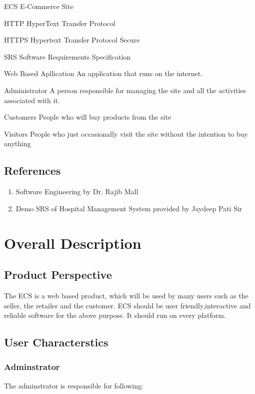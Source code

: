 \documentclass{article}
\begin{document}
\begin{abbrv}
\item[ECS] E-Commerce Site
\item[HTTP]HyperText Transfer Protocol  
\item[HTTPS]Hypertext Transfer Protocol Secure
\item[SRS] Software Requirements Specification
\item[Web Based Apllication] An application that runs on the internet.
\vspace{1cm}
\item[Administrator] A person responsible for managing the site and all the activities associated with it.
\item[Customers] People  who will buy products from the site
\item[Visitors] People who just occasionally visit the site without the intention to buy anything
\end{abbrv}
\subsection{References}
\begin{enumerate}
\item Software Engineering by Dr. Rajib Mall
\item Demo SRS of Hospital Management System provided by Jaydeep Pati Sir
\end{enumerate}
		

\section{Overall Description}
\subsection{Product Perspective}
The ECS is a web based product, which will be used by many users such as the seller, the retailer and the customer. ECS should be user friendly,interactive and reliable software for the above purpose. It should run on every platform.

\subsection{User Characterstics}
\subsubsection{Adminstrator}
The adminstrator is responsible for  following:
\end{document}
